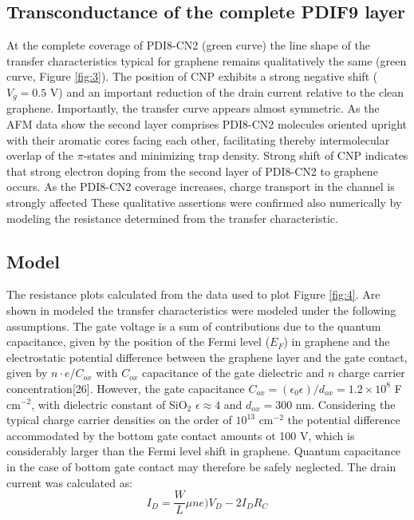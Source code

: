 \documentclass[preprint,aip,jap]{revtex4-2}
\begin{document}
\subsection{Transconductance of the complete PDIF9 layer}
\label{sec:complete}

At the complete coverage of PDI8-CN2 (green curve) the line shape of the transfer characteristics typical for graphene remains qualitatively the same (green curve, Figure \ref{fig:3}).  The position of CNP exhibits a strong negative shift ($V_g=0.5$ V) and an important reduction of the drain current relative to the clean graphene. Importantly, the transfer curve appears almost symmetric.  As the AFM data show the second layer comprises PDI8-CN2 molecules oriented upright with their aromatic cores facing each other, facilitating thereby intermolecular overlap of the $\pi$-states and minimizing trap density.  Strong shift of CNP indicates that strong electron doping from the second layer of PDI8-CN2 to  graphene occurs. As the PDI8-CN2 coverage increases, charge transport in the channel is strongly affected
These qualitative assertions were confirmed also numerically by modeling the resistance determined from the transfer characteristic. 

\subsection{Model}
\label{sec:model}

The resistance plots calculated from the data used to plot Figure \ref{fig:4}.  Are shown in modeled the transfer characteristics were modeled under the following assumptions. The gate voltage is a sum of contributions due to the quantum capacitance, given by the position of the Fermi level  ($E_F$) in graphene and the  electrostatic potential difference between the graphene layer and the gate contact, given by $n\cdot e/C_{ox}$ with $C_{ox}$ capacitance of the gate dielectric and $n$  charge carrier concentration\cite{sze-2006}[26].  However, the gate capacitance $C_{ox}=(\epsilon_0\epsilon)/d_{ox} =1.2\times10^8$ F cm$^{-2}$, with dielectric constant of SiO$_{2}$  $\epsilon \approx 4$ and $d_{ox}=$300 nm.  Considering the typical charge carrier densities on the order of $10^{13}$ cm$^{-2}$ the potential difference accommodated by the bottom gate contact amounts ot 100 V, which is considerably larger than the Fermi level shift in graphene.  Quantum capacitance in the case of bottom gate contact may therefore be safely neglected\cite{das-2008}. The drain current was  calculated as:
\begin{equation}
  \label{eq:2}
  I_{D}=\frac{W}{L}\mu n e)V_{D}- 2I_{D}R_{C}
\end{equation}
\end{document}
